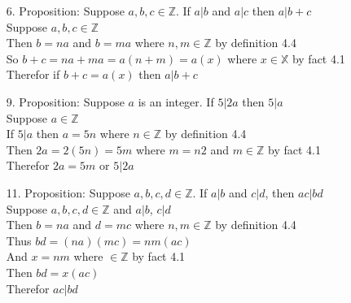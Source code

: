 \documentclass[sigconf]{article}
\begin{document}
\begin{itemize}
  \item[6.] Proposition: Suppose $a,b,c\in \mathbb{Z}$. If $a|b$ and $a|c$ then $a|b+c$\\
            Suppose $a,b,c\in \mathbb{Z}$\\
            Then $b=na$ and $b=ma$ where $n,m\in \mathbb{Z}$ by definition 4.4\\
            So $b+c=na+ma=a(n+m)=a(x)$ where $x\in\mathbb{X}$ by fact 4.1\\
            Therefor if $b+c=a(x)$ then $a|b+c$\\

            \clearpage
  \item[9.] Proposition: Suppose $a$ is an integer. If $5|2a$ then $5|a$\\
            Suppose $a\in\mathbb{Z}$\\
            If $5|a$ then $a=5n$ where $n\in\mathbb{Z}$ by definition 4.4\\
            Then $2a=2(5n)=5m$ where $m=n2$ and $m\in\mathbb{Z}$ by fact 4.1\\
            Therefor $2a=5m$ or $5|2a$\\

  \item[11.] Proposition: Suppose $a,b,c,d\in\mathbb{Z}$. If $a|b$ and $c|d$, then $ac|bd$\\
            Suppose $a,b,c,d\in\mathbb{Z}$ and $a|b$, $c|d$\\
            Then $b=na$ and $d=mc$ where $n,m\in\mathbb{Z}$ by definition 4.4\\
            Thus $bd=(na)(mc)=nm(ac)$\\
            And $x=nm$ where $\in\mathbb{Z}$ by fact 4.1\\
            Then $bd=x(ac)$\\
            Therefor $ac|bd$\\

\end{itemize}



\end{document}
